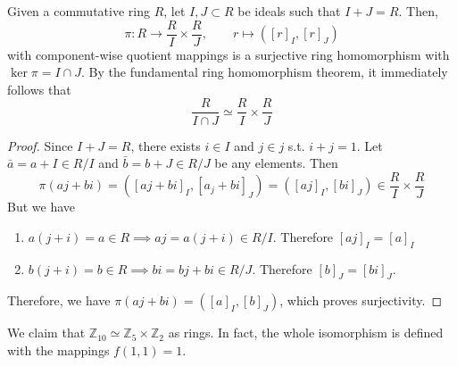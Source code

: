   \begin{corollary}
    \label{thm:chinese-remainder-theorem}
    Given a commutative ring $R$, let $I, J \subset R$ be ideals such that $I + J = R$. Then, 
    \begin{equation}
      \pi: R \to \frac{R}{I} \times \frac{R}{J}, \qquad r \mapsto ([r]_I, [r]_J)
    \end{equation}
    with component-wise quotient mappings is a surjective ring homomorphism with $\ker{\pi} = I \cap J$. By the fundamental ring homomorphism theorem, it immediately follows that 
    \begin{equation}
      \frac{R}{I \cap J} \simeq \frac{R}{I} \times \frac{R}{J}
    \end{equation}
  \end{corollary}
  \begin{proof}
    Since $I + J = R$, there exists $i \in I$ and $j \in j$ s.t. $i + j = 1$. Let $\bar{a} = a + I \in R/I$ and $\bar{b} = b + J \in R/J$ be any elements. Then 
    \begin{equation}
      \pi(aj + bi) = ([aj + bi]_I, [a_j + bi]_J) = ([aj]_I, [bi]_J) \in \frac{R}{I} \times \frac{R}{J}
    \end{equation} 
    But we have 
    \begin{enumerate}
      \item $a(j + i) = a \in R \implies aj = a(j + i) \in R/I$. Therefore $[aj]_I = [a]_I$ 
      \item $b(j + i) = b \in R \implies bi = bj + bi \in R/J$. Therefore $[b]_J = [bi]_J$. 
    \end{enumerate}
    Therefore, we have $\pi(aj + bi) = ([a]_I, [b]_J)$, which proves surjectivity. 
  \end{proof} 

  \begin{example}
    \label{ex:z10simeqz5timesz2}
    We claim that $\mathbb{Z}_{10} \simeq \mathbb{Z}_5 \times \mathbb{Z}_2$ as rings. In fact, the whole isomorphism is defined with the mappings $f(1, 1) = 1$. 
  \end{example}

